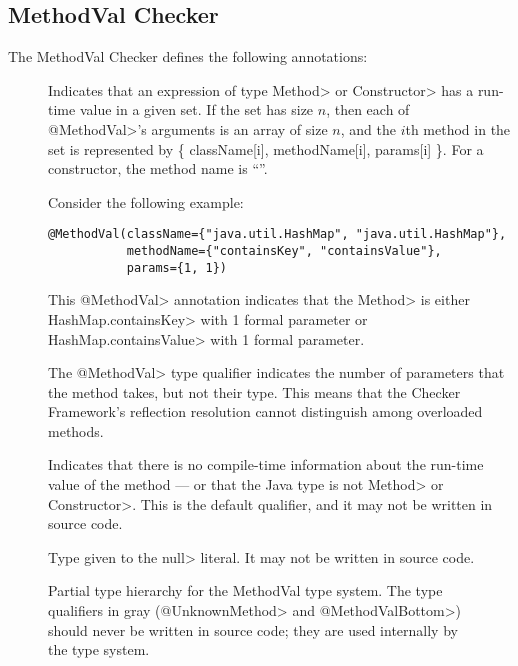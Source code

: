 \subsection{MethodVal Checker\label{methodval-checker}}

The MethodVal Checker defines the following annotations:

\begin{description}
\item[]
Indicates that an expression of type \<Method> or \<Constructor> has a
run-time value in a given set.  If the set has size $n$, then each of
\<@MethodVal>'s arguments is an array of size $n$, and the $i$th method in the set is
represented by \{ className[i], methodName[i], params[i] \}.
For a constructor, the method name is ``''.

Consider the following example:

\begin{Verbatim}
@MethodVal(className={"java.util.HashMap", "java.util.HashMap"},
           methodName={"containsKey", "containsValue"},
           params={1, 1})
\end{Verbatim}

\noindent
This \<@MethodVal> annotation indicates that the \<Method>
is either \<HashMap.containsKey> with 1 formal parameter or
\<HashMap.containsValue> with 1 formal parameter.

The \<@MethodVal> type qualifier indicates the number of
parameters that the method takes, but not their type.  This means that the
Checker Framework's reflection resolution cannot distinguish among
overloaded methods.

\item[] Indicates that there is no
  compile-time information about the run-time value of the method --- or
  that the Java type is not \<Method> or \<Constructor>.
  This is the default qualifier, and it may not be written in source code.

\item[] Type given to the \<null> literal.
  It may not be written in source code.
\end{description}

\begin{figure}
\caption{Partial type hierarchy for the MethodVal type system. The type qualifiers in gray (\<@UnknownMethod>
and \<@MethodValBottom>) should never be written in source code; they are used internally by the type system.}
\label{fig-methodval-hierarchy}
\end{figure}

